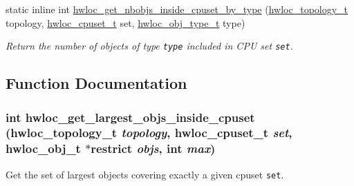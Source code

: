\begin{CompactItemize}
static inline int \hyperlink{group__hwlocality__helper__find__inside_g7e44cec58c6bdb681400a52d007d2597}{hwloc\_\-get\_\-nbobjs\_\-inside\_\-cpuset\_\-by\_\-type} (\hyperlink{group__hwlocality__topology_g9d1e76ee15a7dee158b786c30b6a6e38}{hwloc\_\-topology\_\-t} topology, \hyperlink{group__hwlocality__cpuset_g82e51d695c430832b703dad5ab8d75e4}{hwloc\_\-cpuset\_\-t} set, \hyperlink{group__hwlocality__types_gcd37bb612667dc437d66bfb175a8dc55}{hwloc\_\-obj\_\-type\_\-t} type)
\begin{CompactList}\small\item\em Return the number of objects of type {\tt type} included in CPU set {\tt set}. \item\end{CompactList}\end{CompactItemize}


\subsection{Function Documentation}
\hypertarget{group__hwlocality__helper__find__inside_g762bf572ecf691ad812977ce29496ac2}{
\subsubsection[{hwloc\_\-get\_\-largest\_\-objs\_\-inside\_\-cpuset}]{\setlength{\rightskip}{0pt plus 5cm}int hwloc\_\-get\_\-largest\_\-objs\_\-inside\_\-cpuset ({\bf hwloc\_\-topology\_\-t} {\em topology}, \/  {\bf hwloc\_\-cpuset\_\-t} {\em set}, \/  {\bf hwloc\_\-obj\_\-t} $\ast$restrict {\em objs}, \/  int {\em max})}}
\label{group__hwlocality__helper__find__inside_g762bf572ecf691ad812977ce29496ac2}


Get the set of largest objects covering exactly a given cpuset {\tt set}. 


